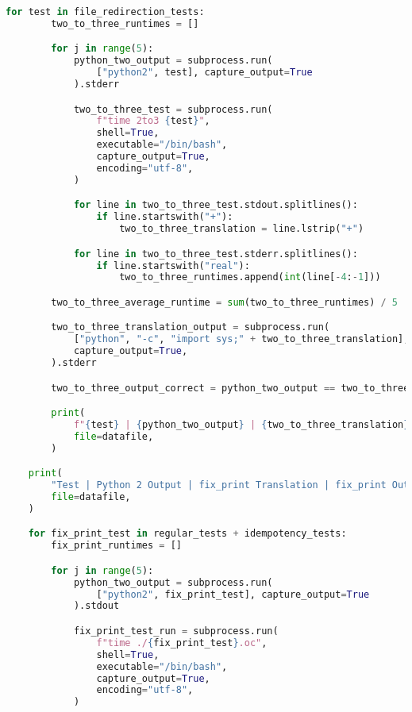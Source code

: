 \begin{lstlisting}[language=Python]
    for test in file_redirection_tests:
        two_to_three_runtimes = []

        for j in range(5):
            python_two_output = subprocess.run(
                ["python2", test], capture_output=True
            ).stderr

            two_to_three_test = subprocess.run(
                f"time 2to3 {test}",
                shell=True,
                executable="/bin/bash",
                capture_output=True,
                encoding="utf-8",
            )

            for line in two_to_three_test.stdout.splitlines():
                if line.startswith("+"):
                    two_to_three_translation = line.lstrip("+")

            for line in two_to_three_test.stderr.splitlines():
                if line.startswith("real"):
                    two_to_three_runtimes.append(int(line[-4:-1]))

        two_to_three_average_runtime = sum(two_to_three_runtimes) / 5

        two_to_three_translation_output = subprocess.run(
            ["python", "-c", "import sys;" + two_to_three_translation],
            capture_output=True,
        ).stderr

        two_to_three_output_correct = python_two_output == two_to_three_translation_output

        print(
            f"{test} | {python_two_output} | {two_to_three_translation} | {two_to_three_translation_output} | {two_to_three_output_correct} | {two_to_three_runtimes[0]} | {two_to_three_runtimes[1]} | {two_to_three_runtimes[2]} | {two_to_three_runtimes[3]} | {two_to_three_runtimes[4]} | {two_to_three_average_runtime}",
            file=datafile,
        )

    print(
        "Test | Python 2 Output | fix_print Translation | fix_print Output | fix_print Output Correct | fix_print Run Time 1 (ms) | fix_print Run Time 2 (ms) | fix_print Run Time 3 (ms) | fix_print Run Time 4 (ms) | fix_print Run Time 5 (ms) | fix_print Average Run Time (ms)",
        file=datafile,
    )

    for fix_print_test in regular_tests + idempotency_tests:
        fix_print_runtimes = []

        for j in range(5):
            python_two_output = subprocess.run(
                ["python2", fix_print_test], capture_output=True
            ).stdout

            fix_print_test_run = subprocess.run(
                f"time ./{fix_print_test}.oc",
                shell=True,
                executable="/bin/bash",
                capture_output=True,
                encoding="utf-8",
            )


\end{lstlisting}
